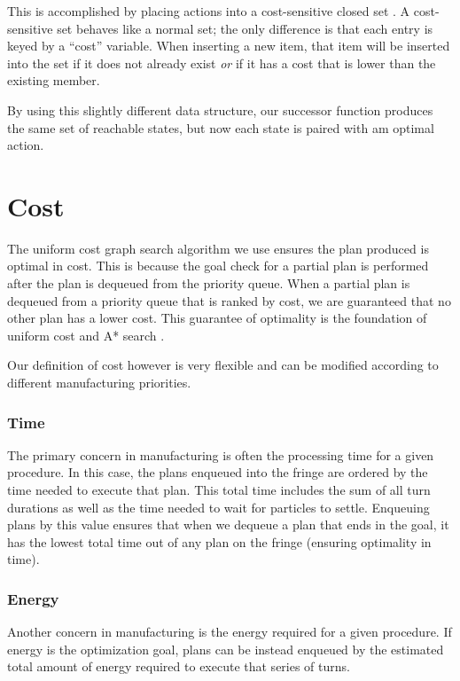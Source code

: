 This is accomplished by placing actions into a cost-sensitive closed set \cite{AIBook}. A cost-sensitive set behaves like a normal set; the only difference is that each entry is keyed by a ``cost'' variable. When inserting a new item, that item will be inserted into the set if it does not already exist \emph{or} if it has a cost that is lower than the existing member.

By using this slightly different data structure, our successor function produces the same set of reachable states, but now each state is paired with am optimal action.

\section{Cost}

The uniform cost graph search algorithm we use ensures the plan produced is optimal in cost. This is because the goal check for a partial plan is performed after the plan is dequeued from the priority queue. When a partial plan is dequeued from a priority queue that is ranked by cost, we are guaranteed that no other plan has a lower cost. This guarantee of optimality is the foundation of uniform cost and A* search \cite{AIBook}.

Our definition of cost however is very flexible and can be modified according to different manufacturing priorities.

		\subsubsection{Time}

The primary concern in manufacturing is often the processing time for a given procedure. In this case, the plans enqueued into the fringe are ordered by the time needed to execute that plan. This total time includes the sum of all turn durations as well as the time needed to wait for particles to settle. Enqueuing plans by this value ensures that when we dequeue a plan that ends in the goal, it has the lowest total time out of any plan on the fringe (ensuring optimality in time).

		\subsubsection{Energy}

Another concern in manufacturing is the energy required for a given procedure. If energy is the optimization goal, plans can be instead enqueued by the estimated total amount of energy required to execute that series of turns.



